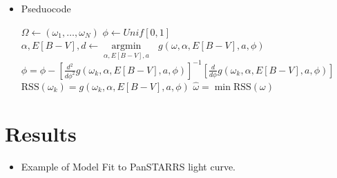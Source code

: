 \documentclass[a0,portrait]{a0poster}
\newcommand{\argmin}[1]{\underset{#1}{\operatorname{argmin}}\text{ }}
\begin{document}
\begin{multicols}{2}
\begin{itemize}
\item Pseduocode

\begin{algorithmic}[1]
  \State $\Omega \gets (\omega_1,\ldots,\omega_N)$ 
  \State $\phi \gets Unif[0,1]$ 
  \State $\alpha,E[B-V],d \gets \argmin{\alpha,E[B-V],a} g(\omega,\alpha,E[B-V],a,\phi)$  
  \State $\phi = \phi - \left[\frac{d^2}{d\phi^2}g(\omega_k,\alpha,E[B-V],a,\phi)\right]^{-1}\left[\frac{d}{d\phi}g(\omega_k,\alpha,E[B-V],a,\phi)\right] $ 
  \EndFor
  \State $\text{RSS}(\omega_k) = g(\omega_k,\alpha,E[B-V],a,\phi)$
  \EndFor
  \State $\widehat{\omega} = \min \text{RSS}(\omega)$
\end{algorithmic}







\end{itemize}


\section*{Results}

\begin{itemize}
\item Example of Model Fit to PanSTARRS light curve.


\end{itemize}
\end{multicols}
\end{document}
